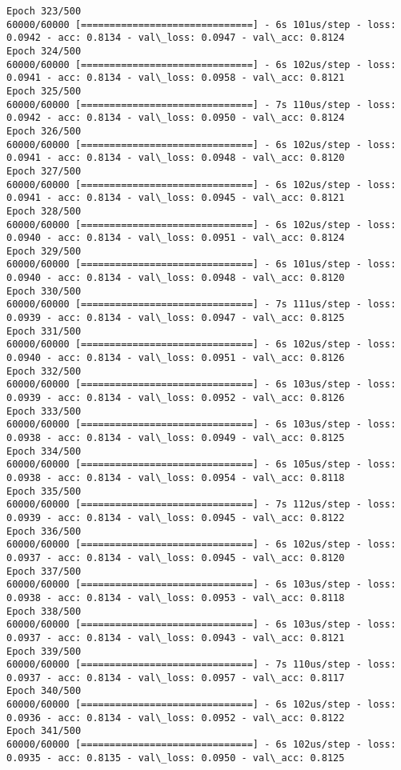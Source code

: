 \documentclass[11pt]{article}
\begin{document}
\begin{Verbatim}[commandchars=\\\{\}]
Epoch 323/500
60000/60000 [==============================] - 6s 101us/step - loss: 0.0942 - acc: 0.8134 - val\_loss: 0.0947 - val\_acc: 0.8124
Epoch 324/500
60000/60000 [==============================] - 6s 102us/step - loss: 0.0941 - acc: 0.8134 - val\_loss: 0.0958 - val\_acc: 0.8121
Epoch 325/500
60000/60000 [==============================] - 7s 110us/step - loss: 0.0942 - acc: 0.8134 - val\_loss: 0.0950 - val\_acc: 0.8124
Epoch 326/500
60000/60000 [==============================] - 6s 102us/step - loss: 0.0941 - acc: 0.8134 - val\_loss: 0.0948 - val\_acc: 0.8120
Epoch 327/500
60000/60000 [==============================] - 6s 102us/step - loss: 0.0941 - acc: 0.8134 - val\_loss: 0.0945 - val\_acc: 0.8121
Epoch 328/500
60000/60000 [==============================] - 6s 102us/step - loss: 0.0940 - acc: 0.8134 - val\_loss: 0.0951 - val\_acc: 0.8124
Epoch 329/500
60000/60000 [==============================] - 6s 101us/step - loss: 0.0940 - acc: 0.8134 - val\_loss: 0.0948 - val\_acc: 0.8120
Epoch 330/500
60000/60000 [==============================] - 7s 111us/step - loss: 0.0939 - acc: 0.8134 - val\_loss: 0.0947 - val\_acc: 0.8125
Epoch 331/500
60000/60000 [==============================] - 6s 102us/step - loss: 0.0940 - acc: 0.8134 - val\_loss: 0.0951 - val\_acc: 0.8126
Epoch 332/500
60000/60000 [==============================] - 6s 103us/step - loss: 0.0939 - acc: 0.8134 - val\_loss: 0.0952 - val\_acc: 0.8126
Epoch 333/500
60000/60000 [==============================] - 6s 103us/step - loss: 0.0938 - acc: 0.8134 - val\_loss: 0.0949 - val\_acc: 0.8125
Epoch 334/500
60000/60000 [==============================] - 6s 105us/step - loss: 0.0938 - acc: 0.8134 - val\_loss: 0.0954 - val\_acc: 0.8118
Epoch 335/500
60000/60000 [==============================] - 7s 112us/step - loss: 0.0939 - acc: 0.8134 - val\_loss: 0.0945 - val\_acc: 0.8122
Epoch 336/500
60000/60000 [==============================] - 6s 102us/step - loss: 0.0937 - acc: 0.8134 - val\_loss: 0.0945 - val\_acc: 0.8120
Epoch 337/500
60000/60000 [==============================] - 6s 103us/step - loss: 0.0938 - acc: 0.8134 - val\_loss: 0.0953 - val\_acc: 0.8118
Epoch 338/500
60000/60000 [==============================] - 6s 103us/step - loss: 0.0937 - acc: 0.8134 - val\_loss: 0.0943 - val\_acc: 0.8121
Epoch 339/500
60000/60000 [==============================] - 7s 110us/step - loss: 0.0937 - acc: 0.8134 - val\_loss: 0.0957 - val\_acc: 0.8117
Epoch 340/500
60000/60000 [==============================] - 6s 102us/step - loss: 0.0936 - acc: 0.8134 - val\_loss: 0.0952 - val\_acc: 0.8122
Epoch 341/500
60000/60000 [==============================] - 6s 102us/step - loss: 0.0935 - acc: 0.8135 - val\_loss: 0.0950 - val\_acc: 0.8125

\end{Verbatim}
\end{document}

